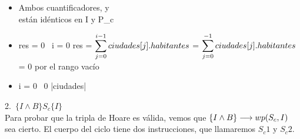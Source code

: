 \documentclass[10pt,a4paper,fleqn]{article}
\begin{document}
\begin{itemize}
    \item \parbox[t]{\textwidth}{ Ambos cuantificadores,  y \\ están idénticos en I y P_c} 
    \item \parbox[t]{\textwidth}{res = 0 \land \ i = 0 \implica res = $\small \displaystyle \sum_{j=0}^{i-1} ciudades[j].habitantes$ = $\small \displaystyle \sum_{j=0}^{-1} ciudades[j].habitantes$ = 0 por el rango vacío }
     \item \parbox[t]{\textwidth}{i = 0 \implica \ 0  \leq |ciudades|}
\end{itemize}
\item 2.\ $\{I \land B\}S_c\{I\}$  \\Para probar que la tripla de Hoare es válida, vemos que $\{I \land B\} \longrightarrow wp(S_c,I)$ sea cierto.
El cuerpo del ciclo tiene dos instrucciones, que llamaremos $S_c1$ y $S_c2$. 
\end{document}
